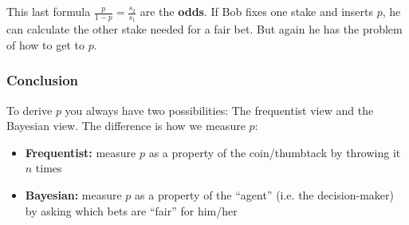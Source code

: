 This last formula $\frac{p}{1-p} = \frac{s_2}{s_1}$ are the \textbf{odds}. If Bob fixes one stake and inserts $p$, he can calculate the other stake needed for a fair bet. But again he has the problem of how to get to $p$.

\subsubsection*{Conclusion}
To derive $p$ you always have two possibilities: The frequentist view and the Bayesian view. The difference is how we measure $p$:
\begin{itemize}
	\item \textbf{Frequentist:} measure $p$ as a property of the coin/thumbtack by throwing it $n$ times
  \item \textbf{Bayesian:} measure $p$ as a property of the ``agent'' (i.e. the decision-maker) by asking which bets are ``fair'' for him/her
\end{itemize}